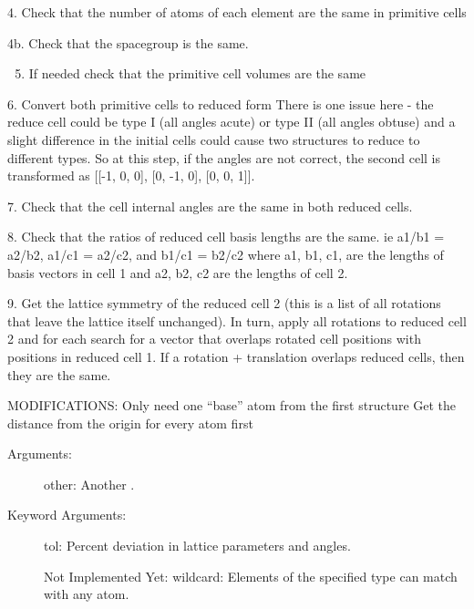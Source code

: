 \documentclass[letterpaper,10pt,english]{sphinxmanual}
\begin{document}
\begin{fulllineitems}
\begin{fulllineitems}
\begin{enumerate}
\end{enumerate}

4. Check that the number of atoms of each element are the same in
primitive cells

4b. Check that the spacegroup is the same.
\begin{enumerate}
\setcounter{enumi}{4}
\item {} 
If needed check that the primitive cell volumes are the same

\end{enumerate}

6. Convert both primitive cells to reduced form There is one issue here - 
the reduce cell could be type I (all angles acute) or type II (all angles 
obtuse) and a slight difference in the initial cells could cause two 
structures to reduce to different types. So at this step, if the angles 
are not correct, the second cell is transformed as 
{[}{[}-1, 0, 0{]}, {[}0, -1, 0{]}, {[}0, 0, 1{]}{]}.

7. Check that the cell internal angles are the same in both reduced
cells.

8. Check that the ratios of reduced cell basis lengths are the same. ie
a1/b1 = a2/b2, a1/c1 = a2/c2, and b1/c1 = b2/c2 where a1, b1, c1, are
the lengths of basis vectors in cell 1 and a2, b2, c2 are the lengths
of cell 2.

9. Get the lattice symmetry of the reduced cell 2 (this is a list of
all rotations that leave the lattice itself unchanged). In turn, apply
all rotations to reduced cell 2 and for each search for a vector that
overlaps rotated cell positions with positions in reduced cell 1. If a
rotation + translation overlaps reduced cells, then they are the same.

MODIFICATIONS:
Only need one ``base'' atom from the first structure
Get the distance from the origin for every atom first
\begin{description}
\item[{Arguments:}] \leavevmode
other: Another .

\item[{Keyword Arguments:}] \leavevmode
tol: Percent deviation in lattice parameters and angles.

Not Implemented Yet:
wildcard: Elements of the specified type can match with any atom.

\end{description}

\end{fulllineitems}


\end{fulllineitems}
\end{document}
